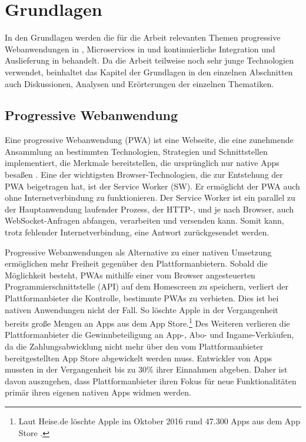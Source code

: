 \chapter{Grundlagen}
\label{chap:grundlagen}
In den Grundlagen werden die für die Arbeit relevanten Themen progressive Webanwendungen in ,
Microservices in  und kontinuierliche Integration und Auslieferung
in  behandelt. Da die Arbeit teilweise noch
sehr junge Technologien verwendet, beinhaltet das Kapitel der Grundlagen in den einzelnen Abschnitten
auch Diskussionen, Analysen und Erörterungen der einzelnen Thematiken.

\section{Progressive Webanwendung}
\label{sec:progressivewebanwendung}
Eine progressive Webanwendung (PWA) ist eine Webseite, die eine zunehmende Ansammlung
an bestimmten Technologien, Strategien und Schnittstellen implementiert,
die Merkmale bereitstellen, die ursprünglich nur native Apps besaßen \cite{WikiPWA}.
Eine der wichtigsten Browser-Technologien, die zur Entstehung der PWA beigetragen hat,
ist der Service Worker (SW). Er ermöglicht der PWA auch ohne Internetverbindung zu funktionieren. Der 
Service Worker ist ein parallel zu der Hauptanwendung laufender Prozess, der \mbox{HTTP-,} und je nach Browser,
auch WebSocket-Anfragen abfangen, verarbeiten und versenden kann. Somit kann, trotz fehlender Internetverbindung,
eine Antwort zurückgesendet werden.\cite{W3ServiceWorker}

Progressive Webanwendungen als Alternative zu einer nativen Umsetzung ermöglichen mehr Freiheit gegenüber den
Plattformanbietern. Sobald die Möglichkeit besteht, PWAs mithilfe einer vom Browser angesteuerten Programmierschnittstelle (API)
auf dem Homescreen zu speichern, verliert der Plattformanbieter die Kontrolle,
bestimmte PWAs zu verbieten. Dies ist bei nativen Anwendungen nicht der Fall. So löschte Apple in der Vergangenheit
bereits große Mengen an Apps aus dem App Store.\footnote{Laut Heise.de löschte Apple im Oktober
2016 rund 47.300 Apps aus dem App Store \cite{HeiseAppleLoeschtApps}.}
Des Weiteren verlieren die Plattformanbieter die Gewinnbeteiligung an App-, Abo- und Ingame-Verkäufen,
da die Zahlungsabwicklung nicht mehr über den vom Plattformanbieter bereitgestellten App Store
abgewickelt werden muss. Entwickler von Apps mussten in der Vergangenheit bis zu 30\% 
ihrer Einnahmen abgeben.\cite{WinFutureEigenerAppStore} Daher ist davon auszugehen,
dass Plattformanbieter ihren Fokus für neue Funktionalitäten primär ihren eigenen
nativen Apps widmen werden.

